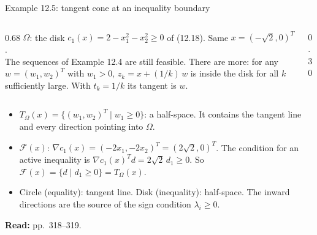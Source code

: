 \documentclass[aspectratio=169,12pt]{beamer}
\newcommand{\readbook}[1]{{\color{red}\textbf{Read:} #1}}
\newcommand{\cF}{\mathcal{F}}
\newcommand{\TO}{T_{\Omega}}
\begin{document}
\begin{frame}{Example 12.5: tangent cone at an inequality boundary}
  \begin{columns}[T,totalwidth=\textwidth]
    \begin{column}{0.68\textwidth}
      $\Omega$: the disk $c_{1}(x)=2-x_{1}^{2}-x_{2}^{2}\ge 0$ of (12.18). Same $x=(-\sqrt2,0)^{T}$.\\[0.2em]
      The sequences of Example 12.4 are still feasible. There are more:
      for any $w=(w_{1},w_{2})^{T}$ with $w_{1}>0$, $z_{k}=x+(1/k)\,w$ is inside the disk
      for all $k$ sufficiently large. With $t_{k}=1/k$ its tangent is $w$.
    \end{column}
    \begin{column}{0.30\textwidth}
      \centering
    \end{column}
  \end{columns}
  \begin{itemize}\setlength\itemsep{0.3em}
    \item $\TO(x)=\{(w_{1},w_{2})^{T}\mid w_{1}\ge 0\}$: a half-space. It contains the tangent line and every
      direction pointing into $\Omega$.
    \item $\cF(x)$: $\nabla c_{1}(x)=(-2x_{1},-2x_{2})^{T}=(2\sqrt2,0)^{T}$. The condition for an active
      inequality is $\nabla c_{1}(x)^{T}d=2\sqrt2\,d_{1}\ge 0$. So $\cF(x)=\{d\mid d_{1}\ge 0\}=\TO(x)$.
    \item Circle (equality): tangent line. Disk (inequality): half-space.
      The inward directions are the source of the sign condition $\lambda_{i}\ge 0$.
  \end{itemize}
  \readbook{pp.~318--319.}
\end{frame}
\end{document}
